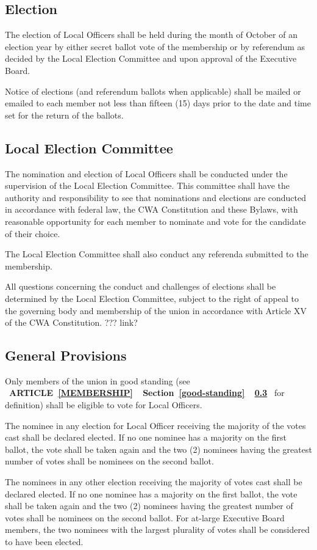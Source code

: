 \documentclass[11pt]{article}
\newcommand{\fullref}[3]{%
  \mbox{\textbf{%
    \ifthenelse{\isempty{#1}}%
    {}%
    {\MakeUppercase{Article \ref{#1}}}%
    \ifthenelse{\isempty{#2}}%
    {}%
    {%
      \ifthenelse{\isempty{#1}}{}{, }%
      Section \ref{#2}%
    }%
    \ifthenelse{\isempty{#3}}%
    {}%
    {\ref{#3}}%
  }}%
}
\begin{document}
\subsection{Election}
The election of Local Officers shall be held during the month of October of an election year by either secret ballot vote of the membership or by referendum as decided by the Local Election Committee and upon approval of the Executive Board.

Notice of elections (and referendum ballots when applicable) shall be mailed or emailed to each member not less than fifteen (15) days prior to the date and time set for the return of the ballots.

\subsection{Local Election Committee}
The nomination and election of Local Officers shall be conducted under the supervision of the Local Election Committee. This committee shall have the authority and responsibility to see that nominations and elections are conducted in accordance with federal law, the CWA Constitution and these Bylaws, with reasonable opportunity for each member to nominate and vote for the candidate of their choice.

The Local Election Committee shall also conduct any referenda submitted to the membership.

All questions concerning the conduct and challenges of elections shall be determined by the Local Election Committee, subject to the right of appeal to the governing body and membership of the union in accordance with Article XV of the CWA Constitution. ??? link?

\subsection{General Provisions}
Only members of the union in good standing (see \fullref{membership}{good-standing}{} for definition) shall be eligible to vote for Local Officers.

The nominee in any election for Local Officer receiving the majority of the votes cast shall be declared elected. If no one nominee has a majority on the first ballot, the vote shall be taken again and the two (2) nominees having the greatest number of votes shall be nominees on the second ballot.

The nominees in any other election receiving the majority of votes cast shall be declared elected. If no one nominee has a majority on the first ballot, the vote shall be taken again and the two (2) nominees having the greatest number of votes shall be nominees on the second ballot. For at-large Executive Board members, the two nominees with the largest plurality of votes shall be considered to have been elected.
\end{document}
